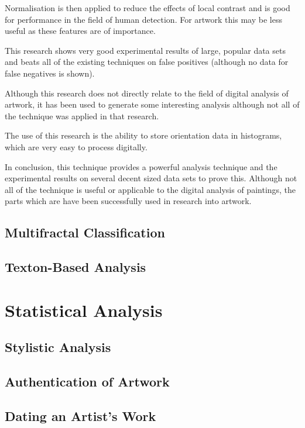 \documentclass[conference]{IEEEtran}
\begin{document}
Normalisation is then applied to reduce the effects of local contrast and is
good for performance in the field of human detection. For artwork this may be
less useful as these features are of importance.

This research shows very good experimental results of large, popular data sets
and beats all of the existing techniques on false positives (although no data
for false negatives is shown).

Although this research does not directly relate to the field of digital
analysis of artwork, it has been used to generate some interesting
analysis\cite{brown13can} although not all of the technique was applied in that
research.

The use of this research is the ability to store orientation data in
histograms, which are very easy to process digitally.

In conclusion, this technique provides a powerful analysis technique and the
experimental results on several decent sized data sets to prove this. Although
not all of the technique is useful or applicable to the digital analysis of
paintings, the parts which are have been successfully used in research into
artwork.

\subsection{Multifractal Classification}

\subsection{Texton-Based Analysis}

\section{Statistical Analysis}

\subsection{Stylistic Analysis}

\subsection{Authentication of Artwork}

\subsection{Dating an Artist's Work}
\end{document}

